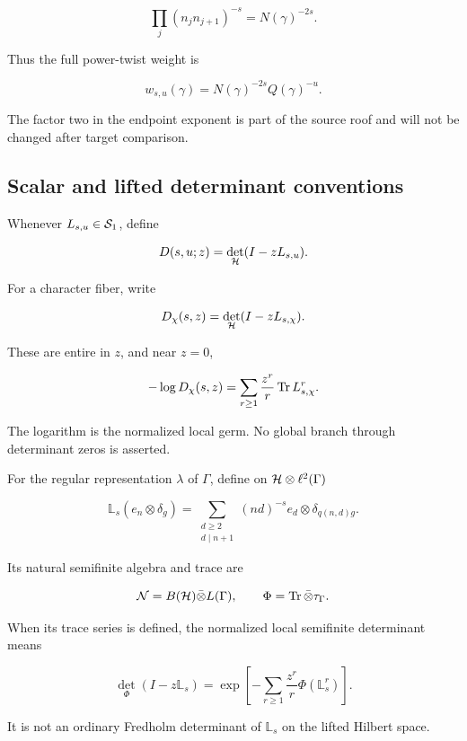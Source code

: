 \begin{equation}
 \prod_j(n_jn_{j+1})^{-s}=N(\gamma)^{-2s}.
\label{eq:endpoint-cycle-weight}
\end{equation}

Thus the full power-twist weight is

\[
 w_{s,u}(\gamma)=N(\gamma)^{-2s}Q(\gamma)^{-u}.
\]

The factor two in the endpoint exponent is part of the source roof and will
not be changed after target comparison.

\subsection{Scalar and lifted determinant conventions}

Whenever \(L_{s,u}\in\mathcal S_1\), define

\[
 D(s,u;z)=\det_{\mathcal H}(I-zL_{s,u}).
\]

For a character fiber, write

\[
 D_\chi(s,z)=\det_{\mathcal H}(I-zL_{s,\chi}).
\]

These are entire in \(z\), and near \(z=0\),

\begin{equation}
 -\log D_\chi(s,z)=
 \sum_{r\ge1}\frac{z^r}{r}\operatorname{Tr} L_{s,\chi}^r.
\label{eq:trace-log}
\end{equation}

The logarithm is the normalized local germ.  No global branch through
determinant zeros is asserted.

For the regular representation \(\lambda\) of \(\Gamma\), define on
\(\mathcal H\otimes\ell^2(\Gamma)\)

\begin{equation}
 \mathbb L_s(e_n\otimes\delta_g)=
 \sum_{\substack{d\ge2\\d\mid n+1}}
 (nd)^{-s}e_d\otimes\delta_{q(n,d)g}.
\label{eq:regular-lift}
\end{equation}

Its natural semifinite algebra and trace are

\[
 \mathcal N=B(\mathcal H)\bar\otimes L(\Gamma),
 \qquad
 \Phi=\operatorname{Tr}\bar\otimes\tau_\Gamma.
\]

When its trace series is defined, the normalized local semifinite determinant
means

\begin{equation}
 \det_\Phi(I-z\mathbb L_s)=
 \exp\left[-\sum_{r\ge1}\frac{z^r}{r}
 \Phi(\mathbb L_s^r)\right].
\label{eq:phi-det}
\end{equation}

It is not an ordinary Fredholm determinant of
\(\mathbb L_s\) on the lifted Hilbert space.
